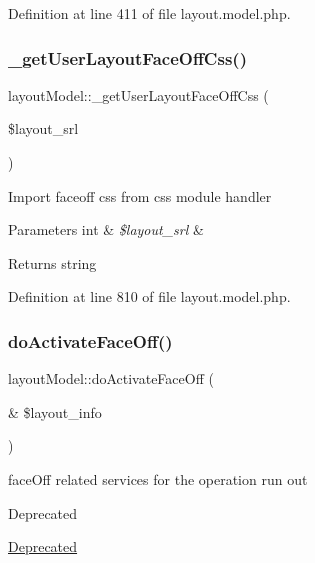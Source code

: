 Definition at line 411 of file layout.\+model.\+php.

\hypertarget{classlayoutModel_ab8fbcb8e92739d001e4a010bc5c5cf3b}{}\label{classlayoutModel_ab8fbcb8e92739d001e4a010bc5c5cf3b} 
\subsubsection{\texorpdfstring{\+\_\+get\+User\+Layout\+Face\+Off\+Css()}{\_getUserLayoutFaceOffCss()}}
{\footnotesize\ttfamily layout\+Model\+::\+\_\+get\+User\+Layout\+Face\+Off\+Css (\begin{DoxyParamCaption}\item[{}]{\$layout\+\_\+srl }\end{DoxyParamCaption})}

Import faceoff css from css module handler 
\begin{DoxyParams}[1]{Parameters}
int & {\em \$layout\+\_\+srl} & \\
\hline
\end{DoxyParams}
\begin{DoxyReturn}{Returns}
string 
\end{DoxyReturn}


Definition at line 810 of file layout.\+model.\+php.

\hypertarget{classlayoutModel_a09e314ac34d65617cbfd2f1aa5f097a8}{}\label{classlayoutModel_a09e314ac34d65617cbfd2f1aa5f097a8} 
\subsubsection{\texorpdfstring{do\+Activate\+Face\+Off()}{doActivateFaceOff()}}
{\footnotesize\ttfamily layout\+Model\+::do\+Activate\+Face\+Off (\begin{DoxyParamCaption}\item[{\&}]{\$layout\+\_\+info }\end{DoxyParamCaption})}

face\+Off related services for the operation run out \begin{DoxyRefDesc}{Deprecated}
\item[\hyperlink{deprecated__deprecated000021}{Deprecated}]\end{DoxyRefDesc}

